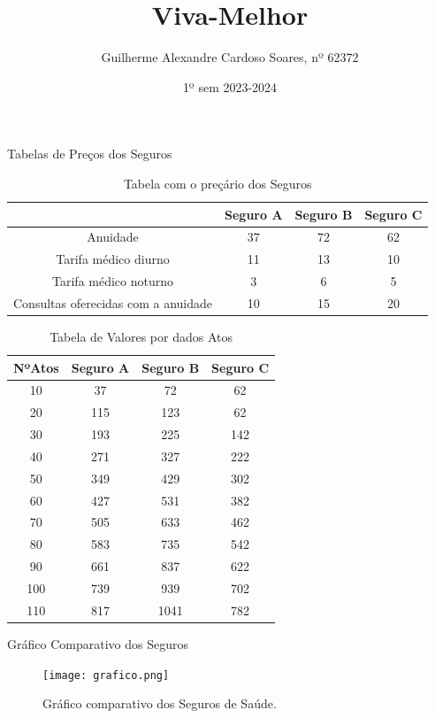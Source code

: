 \documentclass[7]{beamer}
\title{Viva-Melhor}
\author{Guilherme Alexandre Cardoso Soares, nº 62372}
\date{1º sem 2023-2024}
\begin{document}
\begin{frame}
\titlepage
\end{frame}

\begin{frame}{Tabelas de Preços dos Seguros}
\begin{table}[H]
\scriptsize
\centering
\begin{tabular}{|c|c|c|c|}

\hline
    & Seguro A & Seguro B & Seguro C \\
\hline
Anuidade & 37 & 72 & 62 \\ \hline
Tarifa médico diurno& 11 & 13 & 10 \\ \hline
Tarifa médico noturno& 3 & 6 & 5 \\ \hline
Consultas oferecidas com a anuidade& 10 & 15 & 20 \\
\hline
\end{tabular}
\caption{Tabela com o preçário dos Seguros}
\end{table}

\begin{table}[h]
\scriptsize 
\centering
\begin{tabular}{|c|c|c|c|}
\hline
NºAtos & Seguro A & Seguro B & Seguro C \\
\hline
10 & 37 & 72 & 62 \\ \hline
20 & 115 & 123 & 62 \\ \hline
30 & 193 & 225 & 142 \\ \hline
40 & 271 & 327 & 222 \\ \hline
50 & 349 & 429 & 302 \\ \hline
60 & 427 & 531 & 382 \\ \hline
70 & 505 & 633 & 462 \\ \hline
80 & 583 & 735 & 542 \\ \hline
90 & 661 & 837 & 622 \\ \hline
100 & 739 & 939 & 702 \\ \hline
110 & 817 & 1041 & 782 \\
\hline
\end{tabular}
\caption{Tabela de Valores por dados Atos}
\label{tab:valores}
\end{table}
\end{frame}

\begin{frame}{Gráfico Comparativo dos Seguros}

\begin{figure}[H]
\small
\centering
\texttt{[image: grafico.png]}
\caption{Gráfico comparativo dos Seguros de Saúde.}
\end{figure}
\end{frame}
\end{document}
